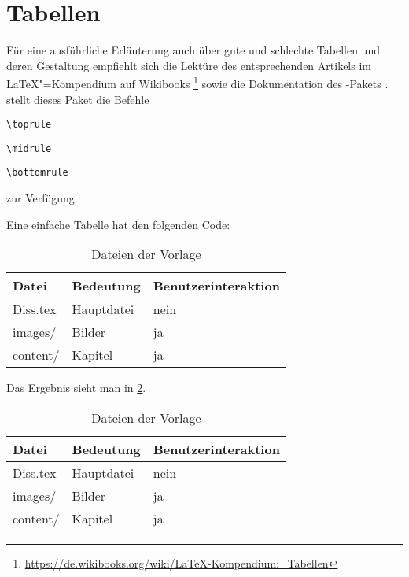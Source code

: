 \section{Tabellen}%
\label{sec:Tabellen}
Für eine ausführliche Erläuterung auch über gute und schlechte Tabellen
und deren Gestaltung empfiehlt sich die Lektüre des entsprechenden Artikels im \LaTeX{}"=Kompendium auf Wikibooks%
\footnote{\url{https://de.wikibooks.org/wiki/LaTeX-Kompendium:_Tabellen}}
sowie die Dokumentation des -Pakets \cite{Fear2005}.
\Ua stellt dieses Paket die Befehle
\begin{itemize*}
	\item \lstinline|\toprule|
	\item \lstinline|\midrule|
	\item \lstinline|\bottomrule|
\end{itemize*}
zur Verfügung.

Eine einfache Tabelle hat den folgenden Code:

\begin{latex}[caption={Einfache Tabelle in \LaTeX},label={lst:tabellenbeispiel}]
\begin{table}%
	\centering%
	\begin{tabularx}{\columnwidth}{l l X}%
		\toprule%
		Datei       &  Bedeutung    &  Benutzerinteraktion \\%
		\midrule%
		Diss.tex  &  Hauptdatei   &  nein     \\%
		images/   &  Bilder       &  ja       \\%
		content/  &  Kapitel      &  ja       \\%
		\bottomrule%
	\end{tabularx}%
	\caption{Dateien der Vorlage}%
	\label{tab:tabellenbeispiel}%
\end{table}
\end{latex}

Das Ergebnis sieht man in \cref{tab:tabellenbeispiel}.

\begin{table}%
	\centering%
	\begin{tabular}{l l l}%
		\toprule%
		Datei       &  Bedeutung    &  Benutzerinteraktion \\%
		\midrule%
		Diss.tex  &  Hauptdatei   &  nein     \\%
		images/   &  Bilder       &  ja       \\%
		content/  &  Kapitel      &  ja       \\%
		\bottomrule%
	\end{tabular}%
	\caption{Dateien der Vorlage}%
	\label{tab:tabellenbeispiel}%
\end{table}

